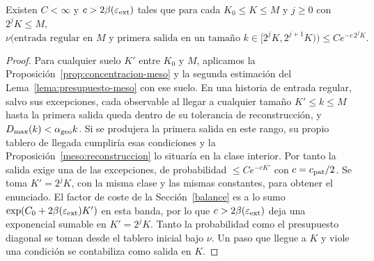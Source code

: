 \begin{proposicion}\label{prop:salida-banda-meso}
Existen $C<\infty$ y $c>2\beta(\varepsilon_{\rm ext})$ tales que para cada $K_0\le K\le M$ y $j\ge0$
con $2^jK\le M$,
\[
 \nu\big(\text{entrada regular en $M$ y primera salida en un tamaño }
              k\in[2^jK,2^{j+1}K)\big)
 \le C e^{-c\,2^jK}.
\]
\end{proposicion}
\begin{proof}
Para cualquier suelo $K'$ entre $K_0$ y $M$, aplicamos la Proposición~\ref{prop:concentracion-meso} y
la segunda estimación del Lema~\ref{lema:presupuesto-meso} con ese suelo. En una historia de entrada
regular, salvo sus excepciones, cada observable al llegar a cualquier tamaño $K'\le k\le M$ hasta la
primera salida queda dentro de su tolerancia de reconstrucción, y $D_{\max}(k)<\alpha_{\rm geo} k$. Si se
produjera la primera salida en este rango, su propio tablero de llegada cumpliría esas condiciones y
la Proposición~\ref{meso:reconstruccion} lo situaría en la clase interior. Por tanto la salida exige
una de las excepciones, de probabilidad $\le Ce^{-cK'}$ con $c=c_{\rm pat}/2$. Se toma $K'=2^jK$,
con la misma clase y las mismas constantes, para obtener el enunciado. El factor de coste de la
Sección~\ref{balance} es a lo sumo $\exp(C_0+2\beta(\varepsilon_{\rm ext})K')$ en esta banda, por
lo que $c>2\beta(\varepsilon_{\rm ext})$ deja una exponencial sumable en $K'=2^jK$. Tanto la
probabilidad como el presupuesto diagonal se toman desde el tablero inicial bajo $\nu$. Un paso que
llegue a $K$ y viole una condición se contabiliza como salida en $K$.
\end{proof}

